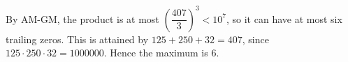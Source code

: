 By AM-GM, the product is at most $(\dfrac{407}{3})^3<10^7$, so it can have at most six trailing zeros. This is attained by $125+250+32=407$, since $125\cdot250\cdot32=1000000$. Hence the maximum is $\boxed6$.
